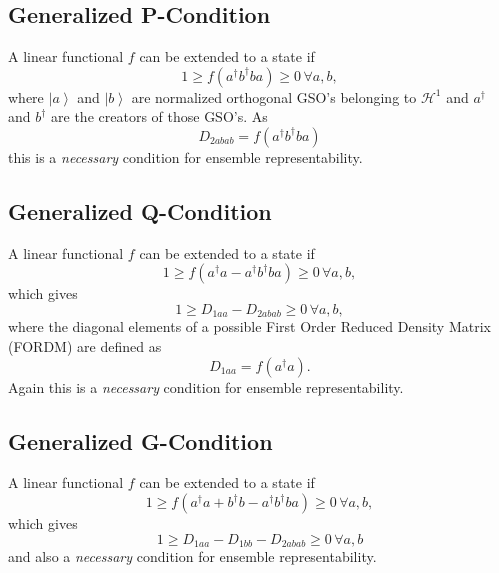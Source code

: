 \documentclass[aps,preprint]{revtex4}%
\begin{document}
\subsection{Generalized P-Condition}

A linear functional $f$ can be extended to a state if
\begin{equation}
1\geq f\left(  a^{\dagger}b^{\dagger}ba\right)  \geq0\,\forall a,b,
\end{equation}
where $\left\vert a\right\rangle $ and $\left\vert b\right\rangle $ are
normalized orthogonal GSO's belonging to $\mathcal{H}^{1}$ and $a^{\dagger}$
and $b^{\dagger}$ are the creators of those GSO's. As
\begin{equation}
D_{2abab}=f\left(  a^{\dagger}b^{\dagger}ba\right)
\end{equation}
this is a \emph{necessary }condition for ensemble representability.

\subsection{Generalized Q-Condition}

A linear functional $f$ can be extended to a state if
\begin{equation}
1\geq f\left(  a^{\dagger}a-a^{\dagger}b^{\dagger}ba\right)  \geq0\,\forall
a,b,
\end{equation}
which gives
\begin{equation}
1\geq D_{1aa}-D_{2abab}\geq0\,\forall a,b, \label{Q1}%
\end{equation}
where the diagonal elements of a possible First Order Reduced Density Matrix
(FORDM) are defined as
\begin{equation}
D_{1aa}=f\left(  a^{\dagger}a\right)  .
\end{equation}
Again this is a \emph{necessary }condition for ensemble representability.

\subsection{Generalized G-Condition}

A linear functional $f$ can be extended to a state if
\begin{equation}
1\geq f\left(  a^{\dagger}a+b^{\dagger}b-a^{\dagger}b^{\dagger}ba\right)
\geq0\,\forall a,b,
\end{equation}
which gives
\begin{equation}
1\geq D_{1aa}-D_{1bb}-D_{2abab}\geq0\,\forall a,b \label{G1}%
\end{equation}
and also a \emph{necessary }condition for ensemble representability.
\end{document}
